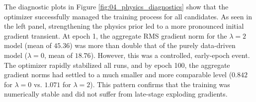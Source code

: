 
The diagnostic plots in Figure \ref{fig:04_physics_diagnostics} show that the optimizer successfully managed the training process for all candidates. As seen in the left panel, strengthening the physics prior led to a more pronounced initial gradient transient. At epoch 1, the aggregate RMS gradient norm for the $\lambda=2$ model (mean of $45.36$) was more than double that of the purely data-driven model ($\lambda=0$, mean of $18.76$). However, this was a controlled, early-epoch event. The optimizer rapidly stabilized all runs, and by epoch 100, the aggregate gradient norms had settled to a much smaller and more comparable level ($0.842$ for $\lambda=0$ vs. $1.071$ for $\lambda=2$). This pattern confirms that the training was numerically stable and did not suffer from late-stage exploding gradients.\\



